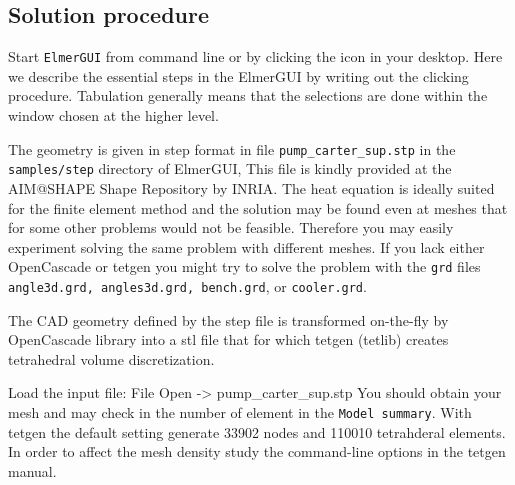 \subsection*{Solution procedure}

Start \texttt{ElmerGUI} from command line or by clicking the icon in your desktop. Here we describe 
the essential steps in the ElmerGUI by writing out the clicking procedure. Tabulation generally means that the 
selections are done within the window chosen at the higher level. 

The geometry is given in step format in file \texttt{pump\_carter\_sup.stp}
in the \texttt{samples/step} directory of ElmerGUI, 
This file is kindly provided at the AIM@SHAPE Shape Repository by INRIA.
The heat equation is ideally suited for the finite element method and 
the solution may be found even at meshes that for some other problems
would not be feasible. Therefore you may easily experiment solving the same
problem with different meshes. If you lack either OpenCascade or tetgen you might try to solve the problem 
with the \texttt{grd} files \texttt{angle3d.grd, angles3d.grd, 
bench.grd}, or \texttt{cooler.grd}.

The CAD geometry defined by the step file is transformed on-the-fly by OpenCascade library into 
a stl file that 
for which tetgen (tetlib) creates tetrahedral volume discretization.

Load the input file:
\ttbegin
File 
  Open -> pump_carter_sup.stp
\ttend
You should obtain your mesh and may check in the number of element in the \texttt{Model summary}. 
With tetgen the default setting generate 33902 nodes and 110010 tetrahderal elements.
In order to affect the mesh density study the command-line options in the tetgen manual.

